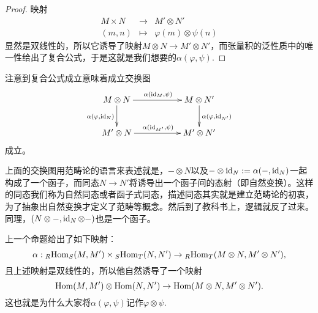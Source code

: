 \begin{proof}
	映射
	\[
	\begin{array}{ccc}
		M\times N&\to& M'\otimes N'\\
		(m,n)&\mapsto& \varphi(m)\otimes \psi(n)
	\end{array}
	\]
	显然是双线性的，所以它诱导了映射$M\otimes N\to M'\otimes N'$，而张量积的泛性质中的唯一性给出了复合公式，于是这就是我们想要的$\alpha(\varphi,\psi)$.
\end{proof}

注意到复合公式成立意味着成立交换图
\[
\begin{xy}
	\xymatrix
	{
		M\otimes N\ar[rr]^{\alpha(\id_M,\psi)}\ar[d]_{\alpha(\varphi,\id_{N})}&&M\otimes N'\ar[d]^{\alpha(\varphi,\id_{N'})}\\
		M'\otimes N\ar[rr]^{\alpha(\id_{M'},\psi)}&&M'\otimes N'
	}
\end{xy}
\]
成立。

上面的交换图用范畴论的语言来表述就是，$-\otimes N$以及$-\otimes \operatorname{id}_N:=\alpha(-,\operatorname{id}_N)$一起构成了一个函子，而同态$N\to N'$将诱导出一个函子间的态射（即自然变换）。这样的同态我们称为自然同态或者函子式同态，描述同态其实就是建立范畴论的初衷，为了抽象出自然变换才定义了范畴等概念。然后到了教科书上，逻辑就反了过来。同理，$(N\otimes -,\operatorname{id}_N\otimes -)$也是一个函子。

\para 上一个命题给出了如下映射：
\[
	\alpha:{}_R\!\operatorname{Hom}_S(M,M')\times {}_S\!\operatorname{Hom}_T(N,N')\to {}_R\!\operatorname{Hom}_T(M\otimes N,M'\otimes N'),
\]
且上述映射是双线性的，所以他自然诱导了一个映射
\[
	\operatorname{Hom}(M,M')\otimes \operatorname{Hom}(N,N')\to \operatorname{Hom}(M\otimes N,M'\otimes N').
\]
这也就是为什么大家将$\alpha(\varphi,\psi)$记作$\varphi\otimes \psi$. 

